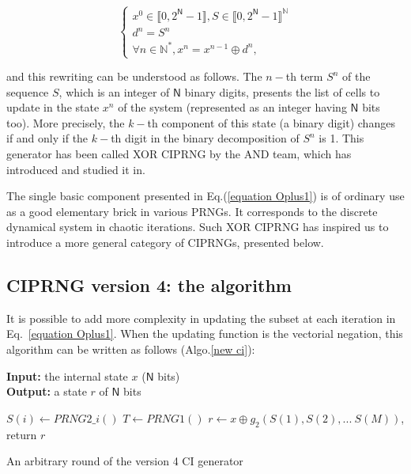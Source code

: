 \begin{equation}
\left\{
\begin{array}{l}
x^0 \in \llbracket 0, 2^\mathsf{N}-1 \rrbracket, S \in \llbracket 0, 2^\mathsf{N}-1 \rrbracket^\mathds{N} \\
d^n = S^n\\
\forall n \in \mathds{N}^*, x^n = x^{n-1} \oplus d^n,
\end{array}
\right.
\label{equation Oplus1}
\end{equation}

\noindent and this rewriting can be understood as follows. The $n-$th term $S^n$ of the sequence $S$, 
which is an integer of $\mathsf{N}$ binary digits, presents
the list of cells to update in the state $x^n$ of the system (represented as an integer 
having $\mathsf{N}$ bits too). More precisely, the $k-$th
component of this state (a binary digit) changes if and only if the $k-$th digit in the 
binary decomposition of $S^n$ is 1. This generator has been called XOR CIPRNG by
the AND team, which has introduced and studied it in\cite{DBLP:journals/corr/abs-1112-5239, bfg12a:ip}.

The single basic component presented in Eq.(\ref{equation Oplus1}) is of ordinary use as a 
good elementary brick in various PRNGs. It corresponds
to the discrete dynamical system in chaotic iterations.
Such XOR CIPRNG has inspired us to introduce a more general category of CIPRNGs, presented
below.

\subsection{CIPRNG version 4: the algorithm}

It is possible to add more complexity in updating the subset 
at each iteration
in Eq.~\ref{equation Oplus1}. 
When the updating function 
is the vectorial negation, this algorithm can be written as follows (Algo.\ref{new ci}):
\begin{algorithm}
\textbf{Input:} the internal state $x$ ($\mathsf{N}$ bits)\\
\textbf{Output:} a state $r$ of $\mathsf{N}$ bits
\begin{algorithmic}[1]
{
\STATE$S(i)\leftarrow PRNG2\_i()$\;
}
\ENDFOR
\STATE$T \leftarrow PRNG1()$\;
\STATE$r \leftarrow x \oplus g_2(S(1),S(2),...~S(M))$,
\STATE return $r$\;
\medskip
\caption{An arbitrary round of the version 4 CI generator}
\label{new ci}
\end{algorithmic}
\end{algorithm}

